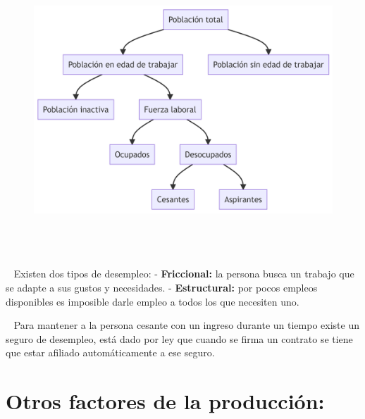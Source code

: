 \documentclass[
  letterpaper,
  DIV=11,
  numbers=noendperiod]{scrreport}
\begin{document}
\begin{figure}[H]

{\centering \includegraphics[width=6.16in,height=4.28in]{5varia_files/figure-latex/mermaid-figure-1.png}

}

\end{figure}

~ Existen dos tipos de desempleo: - \textbf{Friccional:} la persona
busca un trabajo que se adapte a sus gustos y necesidades. -
\textbf{Estructural:} por pocos empleos disponibles es imposible darle
empleo a todos los que necesiten uno.

~ Para mantener a la persona cesante con un ingreso durante un tiempo
existe un seguro de desempleo, está dado por ley que cuando se firma un
contrato se tiene que estar afiliado automáticamente a ese seguro.

\hypertarget{otros-factores-de-la-producciuxf3n}{%
\section{Otros factores de la
producción:}\label{otros-factores-de-la-producciuxf3n}}
\end{document}
